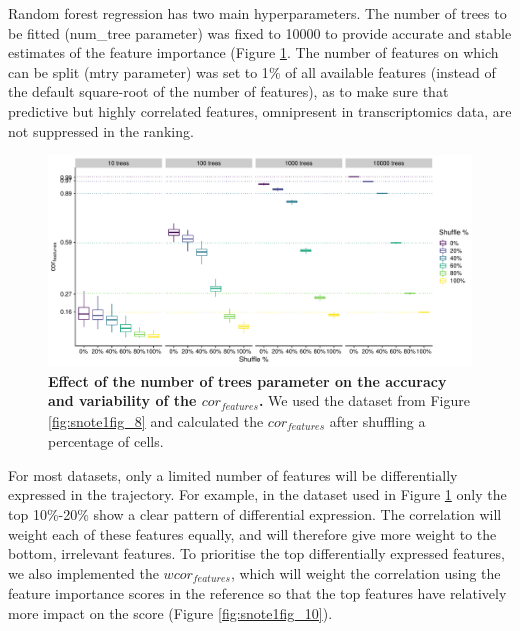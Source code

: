 Random forest regression has two main hyperparameters. The number of trees to be fitted (num\_tree parameter) was fixed to 10000 to provide accurate and stable estimates of the feature importance (Figure \ref{fig:snote1fig_9}. The number of features on which can be split (mtry parameter) was set to 1$\%$ of all available features (instead of the default square-root of the number of features), as to make sure that predictive but highly correlated features, omnipresent in transcriptomics data, are not suppressed in the ranking.

\begin{figure}[tbh!]
	\centering\includegraphics[width=\linewidth]{fig/snote1fig_9.pdf}
	\caption{
		\textbf{Effect of the number of trees parameter on the accuracy and variability of the $\textit{cor}_{\textit{features}}$.} 
		We used the dataset from Figure \ref{fig:snote1fig_8} and calculated the $\textit{cor}_{\textit{features}}$ after shuffling a percentage of cells.
	}
	\label{fig:snote1fig_9}
\end{figure}

For most datasets, only a limited number of features will be differentially expressed in the trajectory. For example, in the dataset used in Figure \ref{fig:snote1fig_9} only the top 10$\%$-20$\%$ show a clear pattern of differential expression. The correlation will weight each of these features equally, and will therefore give more weight to the bottom, irrelevant features. To prioritise the top differentially expressed features, we also implemented the $\textit{wcor}_{\textit{features}}$, which will weight the correlation using the feature importance scores in the reference so that the top features have relatively more impact on the score (Figure \ref{fig:snote1fig_10}).

